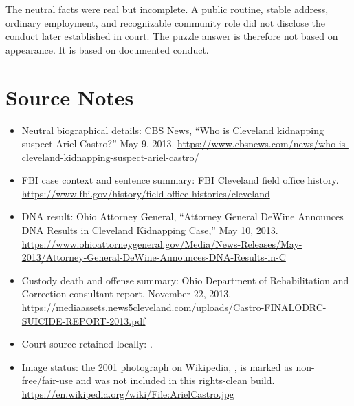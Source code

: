 The neutral facts were real but incomplete. A public routine, stable address,
ordinary employment, and recognizable community role did not disclose the
conduct later established in court. The puzzle answer is therefore not based on
appearance. It is based on documented conduct.

\clearpage

\section*{Source Notes}

\begin{itemize}
  \item Neutral biographical details: CBS News, ``Who is Cleveland kidnapping suspect Ariel Castro?'' May 9, 2013. \url{https://www.cbsnews.com/news/who-is-cleveland-kidnapping-suspect-ariel-castro/}
  \item FBI case context and sentence summary: FBI Cleveland field office history. \url{https://www.fbi.gov/history/field-office-histories/cleveland}
  \item DNA result: Ohio Attorney General, ``Attorney General DeWine Announces DNA Results in Cleveland Kidnapping Case,'' May 10, 2013. \url{https://www.ohioattorneygeneral.gov/Media/News-Releases/May-2013/Attorney-General-DeWine-Announces-DNA-Results-in-C}
  \item Custody death and offense summary: Ohio Department of Rehabilitation and Correction consultant report, November 22, 2013. \url{https://mediaassets.news5cleveland.com/uploads/Castro-FINALODRC-SUICIDE-REPORT-2013.pdf}
  \item Court source retained locally: .
  \item Image status: the 2001 photograph on Wikipedia, , is marked as non-free/fair-use and was not included in this rights-clean build. \url{https://en.wikipedia.org/wiki/File:ArielCastro.jpg}
\end{itemize}
